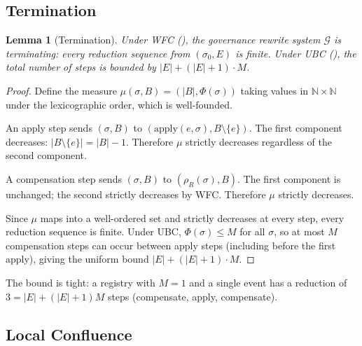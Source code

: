 \documentclass[11pt,a4paper]{article}
\theoremstyle{plain}
\newtheorem{lemma}[theorem]{Lemma}
\theoremstyle{definition}
\theoremstyle{remark}
\renewcommand{\_}{\textunderscore\allowbreak}
\begin{document}
\subsection{Termination}

\begin{lemma}[Termination]
\label{lem:termination}
Under WFC (), the governance rewrite system $\mathcal{G}$ is
terminating: every reduction sequence from $(\sigma_0, E)$ is finite.
Under UBC (), the total number of steps is bounded by
$|E| + (|E| + 1) \cdot M$.
\end{lemma}
\begin{proof}
Define the measure $\mu(\sigma, B) = (|B|, \Phi(\sigma))$ taking values in
$\mathbb{N} \times \mathbb{N}$ under the lexicographic order, which is
well-founded.

An apply step sends $(\sigma, B)$ to $(\mathrm{apply}(e, \sigma), B \setminus \{e\})$.
The first component decreases: $|B \setminus \{e\}| = |B| - 1$.  Therefore
$\mu$ strictly decreases regardless of the second component.

A compensation step sends $(\sigma, B)$ to $(\rho_R(\sigma), B)$.  The first
component is unchanged; the second strictly decreases by WFC.
Therefore $\mu$ strictly decreases.

Since $\mu$ maps into a well-ordered set and strictly decreases at every step,
every reduction sequence is finite.  Under UBC, $\Phi(\sigma) \leq M$ for all
$\sigma$, so at most $M$ compensation steps can occur between apply steps
(including before the first apply), giving the uniform bound
$|E| + (|E| + 1) \cdot M$.
\end{proof}

The bound is tight: a registry with $M = 1$ and a single event has a
reduction of $3 = |E| + (|E|+1) M$ steps (compensate, apply, compensate).

\subsection{Local Confluence}
\end{document}
